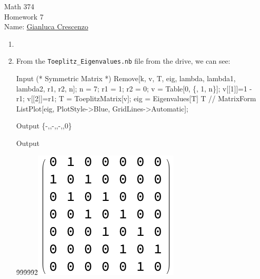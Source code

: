 \documentclass[10pt,twoside,openany]{memoir}
\begin{document}
\begin{center}
{\large Math 374 \\[0.1in]Homework 7 \\[0.1in]}
{Name:} {\underline{Gianluca Crescenzo\hspace*{2in}}}\\[0.15in]
\end{center}
\vspace{4pt}

\begin{enumerate}[label = (\alph*)]
    \addtocounter{enumi}{1}
    \item 
    \item From the \texttt{Toeplitz\_Eigenvalues.nb} file from the drive, we can see:
        \begin{mmaCell}[moredefined={v, T, eig, r1, r2, n, CellToTeX, cell}]{Input}
(* Symmetric Matrix *)
Remove[k, v, T, eig, lambda, lambda1, lambda2, r1, r2, n];
n = 7;
r1 = 1;
r2 = 0;
v = Table[0, \{, 1, n\}];
v[[1]]=1 -  r1;
v[[2]]=r1;
T = ToeplitzMatrix[v];
eig = Eigenvalues[T]
T // MatrixForm
ListPlot[eig, PlotStyle->Blue, GridLines->Automatic];
        \end{mmaCell}
        \begin{mmaCell}[addtoindex=8]{Output}
\{-,,-,,-,,0\}
        \end{mmaCell}

        \begin{mmaCell}[form=MatrixForm]{Output}

        \end{mmaCell}
        \h9\h9\h9\h9\h9\h2\includegraphics[scale=.6]{matrix.png}
          

\end{enumerate}
\end{document}
